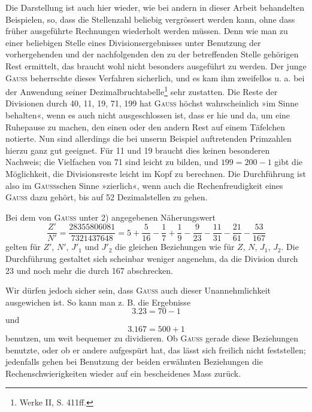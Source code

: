 Die Darstellung ist auch hier wieder, wie bei andern in dieser Arbeit
behandelten Beispielen, so, dass die Stellenzahl beliebig vergrössert werden
kann, ohne dass früher ausgeführte Rechnungen wiederholt werden müssen.
Denn wie man zu einer beliebigen Stelle eines Divisionsergebnisses unter Benutzung der vorhergehenden und der nachfolgenden den zu der betreffenden
Stelle gehörigen Rest ermittelt, das braucht wohl nicht besonders ausgeführt
zu werden. Der junge \textsc{Gauss} beherrschte dieses Verfahren sicherlich, und es
\clearpage{}
\setcounter{footnote}{0}
\noindent kam ihm zweifellos u. a. bei der Anwendung seiner Dezimalbruchtabelle\footnote{Werke II, S. 411ff.} sehr
zustatten. Die Reste der Divisionen durch 40, 11, 19, 71, 199 hat \textsc{Gauss}
höchst wahrscheinlich »im Sinne behalten«, wenn es auch nicht ausgeschlossen
ist, dass er hie und da, um eine Ruhepause zu machen, den einen oder den
andern Rest auf einem Täfelchen notierte. Nun sind allerdings die bei unserm
Beispiel auftretenden Primzahlen hierzu ganz gut geeignet. Für 11 und 19
braucht dies keinen besonderen Nachweis; die Vielfachen von 71 sind leicht
zu bilden, und $199=200-1$ gibt die Möglichkeit, die Divisionsreste leicht
im Kopf zu berechnen. Die Durchführung ist also im \textsc{Gauss}schen Sinne
»zierlich«, wenn auch die Rechenfreudigkeit eines \textsc{Gauss} dazu gehört, bis auf
52 Dezimalstellen zu gehen.

Bei dem von \textsc{Gauss} unter 2) angegebenen Näherungswert
\[
\frac{Z'}{N'}=\frac{28355806081}{7321437648}=5+\frac{5}{16}-\frac{1}{7}+\frac{1}{9}-\frac{9}{23}-\frac{11}{31}-\frac{21}{61}-\frac{53}{167}
\]
\noindent gelten für $Z'$, $N'$, $J'_1$ und $J'_2$ die gleichen Beziehungen wie für $Z$, $N$, $J_1$, $J_2$.
Die Durchführung gestaltet sich scheinbar weniger angenehm, da die Division
durch 23 und noch mehr die durch 167 abschrecken.

Wir dürfen jedoch sicher sein, dass \textsc{Gauss} auch dieser Unannehmlichkeit
ausgewichen ist. So kann man z. B. die Ergebnisse
\[
3\mathord{.}23=70-1
\]
\noindent und
\[
3\mathord{.}167=500+1
\]
\noindent benutzen, um weit bequemer zu dividieren. Ob \textsc{Gauss} gerade diese Beziehungen benutzte, oder ob er andere aufgespürt hat, das lässt sich freilich
nicht feststellen; jedenfalls gehen bei Benutzung der beiden erwähnten Beziehungen die Rechenschwierigkeiten wieder auf ein bescheidenes Mass zurück.

